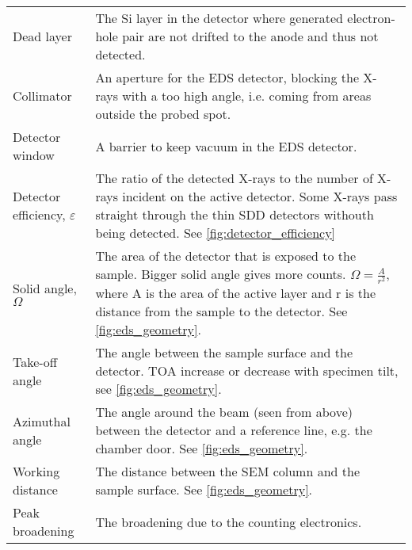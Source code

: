 \begin{table}[pht]
\begin{center}
\begin{tabular}{p{2.9cm}p{12cm}}
            Dead layer                         & The Si layer in the detector where generated electron-hole pair are not drifted to the anode and thus not detected.                                                                                                                                 \\
            Collimator                         & An aperture for the EDS detector, blocking the X-rays with a too high angle, i.e. coming from areas outside the probed spot.                                                                                                                        \\
            Detector window                    & A barrier to keep vacuum in the EDS detector.                                                                                                                                                                                                       \\
            Detector efficiency, $\varepsilon$ & The ratio of the detected X-rays to the number of X-rays incident on the active detector. Some X-rays pass straight through the thin SDD detectors withouth being detected. See \cref{fig:detector_efficiency}                                      \\
            Solid angle, $\Omega$              & The area of the detector that is exposed to the sample. Bigger solid angle gives more counts. $\Omega = \frac{A}{r^2}$, where A is the area of the active layer and r is the distance from the sample to the detector. See \cref{fig:eds_geometry}. \\
            Take-off angle                     & The angle between the sample surface and the detector. TOA increase or decrease with specimen tilt, see \cref{fig:eds_geometry}.                                                                                                                    \\
            Azimuthal angle                    & The angle around the beam (seen from above) between the detector and a reference line, e.g. the chamber door.  See \cref{fig:eds_geometry}.                                                                                                         \\
            Working distance                   & The distance between the SEM column and the sample surface. See \cref{fig:eds_geometry}.                                                                                                                                                            \\
            Peak broadening                    & The broadening due to the counting electronics.                                                                                                                                                                                                     \\
            \hline
        \end{tabular}
    \end{center}
\end{table}